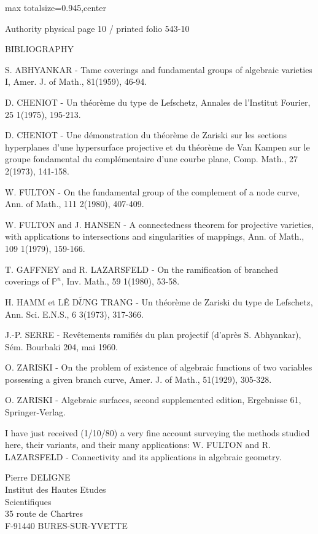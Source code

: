 \documentclass[10pt,a4paper]{article}
\begin{document}
\noindent\begin{adjustbox}{max totalsize={\textwidth}{0.945\textheight},center}
\begin{minipage}{\textwidth}
\noindent\hfill\scriptsize Authority physical page 10 / printed folio 543-10\par\normalsize
\noindent BIBLIOGRAPHY\par\smallskip
\noindent [1] S. ABHYANKAR - Tame coverings and fundamental groups of algebraic varieties I, Amer. J. of Math., 81(1959), 46-94.\par\smallskip
\noindent [2] D. CHENIOT - Un théorème du type de Lefschetz, Annales de l'Institut Fourier, 25 1(1975), 195-213.\par\smallskip
\noindent [2 bis] D. CHENIOT - Une démonstration du théorème de Zariski sur les sections hyperplanes d'une hypersurface projective et du théorème de Van Kampen sur le groupe fondamental du complémentaire d'une courbe plane, Comp. Math., 27 2(1973), 141-158.\par\smallskip
\noindent [3] W. FULTON - On the fundamental group of the complement of a node curve, Ann. of Math., 111 2(1980), 407-409.\par\smallskip
\noindent [4] W. FULTON and J. HANSEN - A connectedness theorem for projective varieties, with applications to intersections and singularities of mappings, Ann. of Math., 109 1(1979), 159-166.\par\smallskip
\noindent [5] T. GAFFNEY and R. LAZARSFELD - On the ramification of branched coverings of \ensuremath{ℙ^n}, Inv. Math., 59 1(1980), 53-58.\par\smallskip
\noindent [6] H. HAMM et LÊ D\ensuremath{\widetilde{U}}NG TRANG - Un théorème de Zariski du type de Lefschetz, Ann. Sci. E.N.S., 6 3(1973), 317-366.\par\smallskip
\noindent [7] J.-P. SERRE - Revêtements ramifiés du plan projectif (d'après S. Abhyankar), Sém. Bourbaki 204, mai 1960.\par\smallskip
\noindent [8] O. ZARISKI - On the problem of existence of algebraic functions of two variables possessing a given branch curve, Amer. J. of Math., 51(1929), 305-328.\par\smallskip
\noindent [9] O. ZARISKI - Algebraic surfaces, second supplemented edition, Ergebnisse 61, Springer-Verlag.\par\smallskip
\noindent I have just received (1/10/80) a very fine account surveying the methods studied here, their variants, and their many applications: W. FULTON and R. LAZARSFELD - Connectivity and its applications in algebraic geometry.\par\smallskip
\noindent Pierre DELIGNE\\Institut des Hautes Etudes\\Scientifiques\\35 route de Chartres\\F-91440 BURES-SUR-YVETTE\par\smallskip
\end{minipage}
\end{adjustbox}
\end{document}
